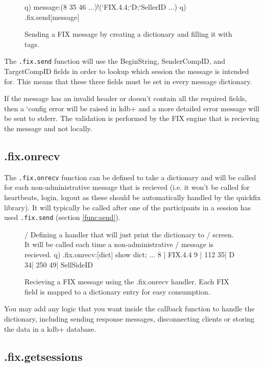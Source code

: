 \begin{figure}[H]
\begin{qcode}
q) message:(8 35 46 ...)!(`FIX.4.4;`D;`SellerID ...)
q) .fix.send[message]
\end{qcode}
\caption{Sending a FIX message by creating a dictionary and filling it with tags.}
\end{figure}

The \texttt{.fix.send} function will use the BeginString, SenderCompID, and TargetCompID fields in order to lookup which session the message is intended for.
This means that these three fields must be set in every message dictionary. 

If the message has an invalid header or doesn't contain all the required fields, then a `config error will be raised in kdb+ and a more detailed error message will be sent to stderr. The validation is performed by the FIX engine that is recieving the message
and not locally.

\subsection{.fix.onrecv}
\label{func:onrecv}

The \texttt{.fix.onrecv} function can be defined to take a dictionary and will be called for each non-administrative message that is recieved (i.e. it won't be called for heartbeats, login, logout as these should be automatically handled by the quickfix library). It will typically be called after one of the participants in a session has used \texttt{.fix.send} (section \ref{func:send}). 

\begin{figure}[H]
\begin{qcode}
/ Defining a handler that will just print the dictionary to
/ screen. It will be called each time a non-administrative
/ message is recieved.
q) .fix.onrecv:{[dict] show dict; }
...
8 | FIX.4.4
9 | 112
35| D
34| 250
49| SellSideID
\end{qcode}
\caption{Recieving a FIX message using the .fix.onrecv handler. Each FIX field is mapped to a dictionary entry for easy consumption. }
\end{figure}

You may add any logic that you want inside the callback function to handle the dictionary, including sending response messages, disconnecting clients or storing
the data in a kdb+ database.

\subsection{.fix.getsessions}
\label{func:getsessions}

